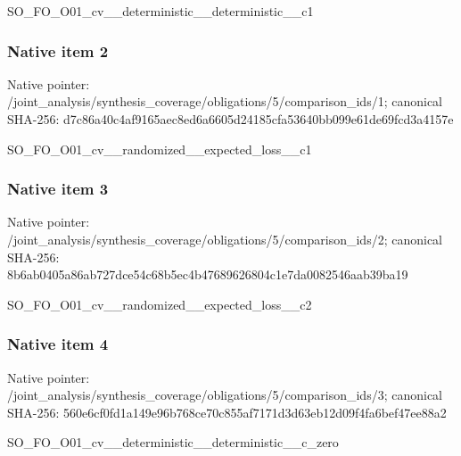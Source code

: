 \documentclass[10pt,a4paper]{article}
\begin{document}
\begingroup\raggedright\sloppy SO\_\allowbreak{}FO\_\allowbreak{}O01\_\allowbreak{}cv\_\allowbreak{}\_\allowbreak{}deterministic\_\allowbreak{}\_\allowbreak{}deterministic\_\allowbreak{}\_\allowbreak{}c1\par\endgroup

\subsubsection{Native item 2}
Native pointer: /joint\_\allowbreak{}analysis/synthesis\_\allowbreak{}coverage/obligations/5/comparison\_\allowbreak{}ids/1; canonical SHA-256: d7c86a40c4af9165aec8ed6a6605d24185cfa53640bb099e61de69fcd3a4157e

\begingroup\raggedright\sloppy SO\_\allowbreak{}FO\_\allowbreak{}O01\_\allowbreak{}cv\_\allowbreak{}\_\allowbreak{}randomized\_\allowbreak{}\_\allowbreak{}expected\_\allowbreak{}loss\_\allowbreak{}\_\allowbreak{}c1\par\endgroup

\subsubsection{Native item 3}
Native pointer: /joint\_\allowbreak{}analysis/synthesis\_\allowbreak{}coverage/obligations/5/comparison\_\allowbreak{}ids/2; canonical SHA-256: 8b6ab0405a86ab727dce54c68b5ec4b47689626804c1e7da0082546aab39ba19

\begingroup\raggedright\sloppy SO\_\allowbreak{}FO\_\allowbreak{}O01\_\allowbreak{}cv\_\allowbreak{}\_\allowbreak{}randomized\_\allowbreak{}\_\allowbreak{}expected\_\allowbreak{}loss\_\allowbreak{}\_\allowbreak{}c2\par\endgroup

\subsubsection{Native item 4}
Native pointer: /joint\_\allowbreak{}analysis/synthesis\_\allowbreak{}coverage/obligations/5/comparison\_\allowbreak{}ids/3; canonical SHA-256: 560e6cf0fd1a149e96b768ce70c855af7171d3d63eb12d09f4fa6bef47ee88a2

\begingroup\raggedright\sloppy SO\_\allowbreak{}FO\_\allowbreak{}O01\_\allowbreak{}cv\_\allowbreak{}\_\allowbreak{}deterministic\_\allowbreak{}\_\allowbreak{}deterministic\_\allowbreak{}\_\allowbreak{}c\_\allowbreak{}zero\par\endgroup
\end{document}
